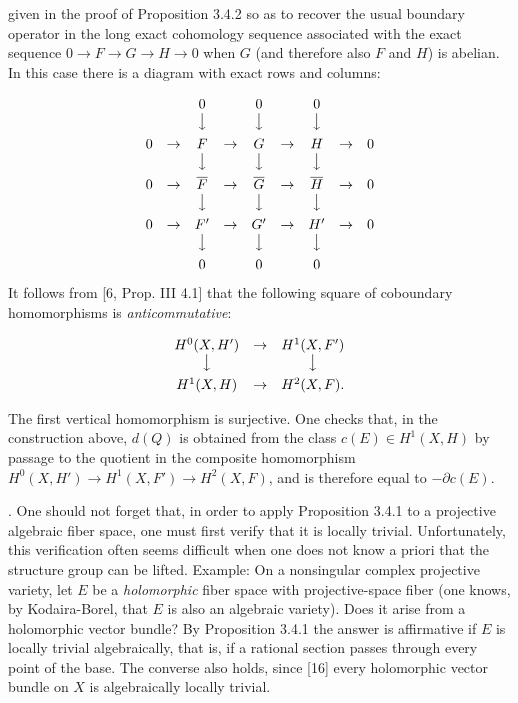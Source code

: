 
given in the proof of Proposition 3.4.2 so as to recover the usual boundary
operator in the long exact cohomology sequence associated with the exact
sequence
$0\to F\to G\to H\to0$
when $G$ (and therefore also $F$ and $H$) is abelian. In this case there is a
diagram with exact rows and columns:

\[
\begin{array}{ccccccccc}
&&0&&0&&0&&\\
&&\big\downarrow&&\big\downarrow&&\big\downarrow&&\\[0.45em]
0&\to&F&\to&G&\to&H&\to&0\\
&&\big\downarrow&&\big\downarrow&&\big\downarrow&&\\[0.45em]
0&\to&\overline F&\to&\overline G&\to&\overline H&\to&0\\
&&\big\downarrow&&\big\downarrow&&\big\downarrow&&\\[0.45em]
0&\to&F'&\to&G'&\to&H'&\to&0\\
&&\big\downarrow&&\big\downarrow&&\big\downarrow&&\\[0.45em]
&&0&&0&&0&&
\end{array}
\]
It follows from [6, Prop. III 4.1] that the following square of coboundary
homomorphisms is \textit{anticommutative}:

\[
\begin{array}{ccc}
H^0(X,H')&\to&H^1(X,F')\\
\big\downarrow&&\big\downarrow\\[0.45em]
H^1(X,H)&\to&H^2(X,F).
\end{array}
\]

The first vertical homomorphism is surjective. One checks that, in the
construction above, $d(Q)$ is obtained from the class $c(E)\in H^1(X,H)$ by
passage to the quotient in the composite homomorphism
$H^0(X,H')\to H^1(X,F')\to H^2(X,F)$,
and is therefore equal to $-\partial c(E)$.

. One should not forget that, in order to apply Proposition 3.4.1 to a
projective algebraic fiber space, one must first verify that it is locally
trivial. Unfortunately, this verification often seems difficult when one
does not know a priori that the structure group can be lifted.
Example: On a nonsingular complex projective variety, let $E$ be a \textit{holomorphic}
fiber space with projective-space fiber (one knows, by Kodaira-Borel, that
$E$ is also an algebraic variety). Does it arise from a holomorphic vector
bundle? By Proposition 3.4.1 the answer is affirmative if $E$ is locally
trivial algebraically, that is, if a rational section passes through every
point of the base. The converse also holds, since [16] every holomorphic vector
bundle on $X$ is algebraically locally trivial.

